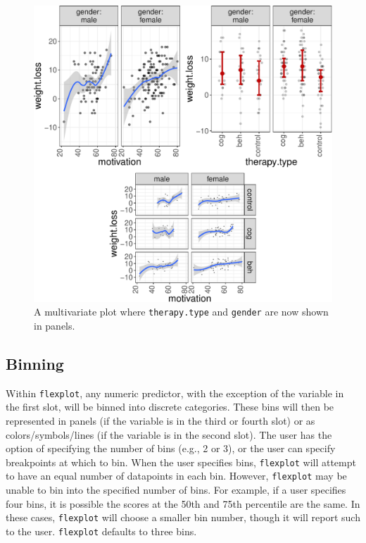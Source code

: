 \documentclass[
  man]{apa6}
\begin{document}
\begin{figure}
\centering
\includegraphics{flexplot_psychmeth_files/figure-latex/panels-1.pdf}
\caption{\label{fig:panels}A multivariate plot where \texttt{therapy.type} and \texttt{gender} are now shown in panels. \label{fig:panels}}
\end{figure}

\normalsize

\hypertarget{binning}{%
\subsection{Binning}\label{binning}}

Within \texttt{flexplot}, any numeric predictor, with the exception of the variable in the first slot, will be binned into discrete categories. These bins will then be represented in panels (if the variable is in the third or fourth slot) or as colors/symbols/lines (if the variable is in the second slot). The user has the option of specifying the number of bins (e.g., 2 or 3), or the user can specify breakpoints at which to bin. When the user specifies bins, \texttt{flexplot} will attempt to have an equal number of datapoints in each bin. However, \texttt{flexplot} may be unable to bin into the specified number of bins. For example, if a user specifies four bins, it is possible the scores at the 50th and 75th percentile are the same. In these cases, \texttt{flexplot} will choose a smaller bin number, though it will report such to the user. \texttt{flexplot} defaults to three bins.
\end{document}
